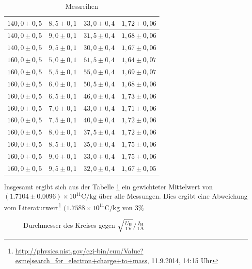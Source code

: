 \documentclass[12pt,a4paper,titlepage,headinclude,bibtotoc]{scrartcl}
\numberwithin{equation}{section}
\begin{document}
\begin{table}[h!]
\begin{tabular}{|c|c|c|c|}
		 $140,0 \pm 0,5$ & $8,5 \pm 0,1$& $33,0 \pm 0,4$ & $1,72 \pm 0,06$\\
		 \hline                         
		 $140,0 \pm 0,5$ & $9,0 \pm 0,1$& $31,5 \pm 0,4$ & $1,68 \pm 0,06$\\
		 \hline                         
		 $140,0 \pm 0,5$ & $9,5 \pm 0,1$& $30,0 \pm 0,4$ & $1,67 \pm 0,06$\\
		 \hline                         
		 $160,0 \pm 0,5$ & $5,0 \pm 0,1$& $61,5 \pm 0,4$ & $1,64 \pm 0,07$\\
		 \hline                         
		 $160,0 \pm 0,5$ & $5,5 \pm 0,1$& $55,0 \pm 0,4$ & $1,69 \pm 0,07$\\
		 \hline                         
		 $160,0 \pm 0,5$ & $6,0 \pm 0,1$& $50,5 \pm 0,4$ & $1,68 \pm 0,06$\\
		 \hline                         
		 $160,0 \pm 0,5$ & $6,5 \pm 0,1$& $46,0 \pm 0,4$ & $1,73 \pm 0,06$\\
		 \hline                         
		 $160,0 \pm 0,5$ & $7,0 \pm 0,1$& $43,0 \pm 0,4$ & $1,71 \pm 0,06$\\
		 \hline                         
		 $160,0 \pm 0,5$ & $7,5 \pm 0,1$& $40,0 \pm 0,4$ & $1,72 \pm 0,06$\\
		 \hline                         
		 $160,0 \pm 0,5$ & $8,0 \pm 0,1$& $37,5 \pm 0,4$ & $1,72 \pm 0,06$\\
		 \hline                         
		 $160,0 \pm 0,5$ & $8,5 \pm 0,1$& $35,0 \pm 0,4$ & $1,75 \pm 0,06$\\
		 \hline                         
		 $160,0 \pm 0,5$ & $9,0 \pm 0,1$& $33,0 \pm 0,4$ & $1,75 \pm 0,06$\\
		 \hline                         
		 $160,0 \pm 0,5$ & $9,5 \pm 0,1$& $32,0 \pm 0,4$ & $1,67 \pm 0,05$\\
		  \hline
	  \end{tabular}
	  \caption{Messreihen}
	  \label{tbl:pythonmessung}
  \end{table}
Insgesamt ergibt sich aus der Tabelle \ref{tbl:pythonmessung} ein gewichteter Mittelwert von $(1.7104 \pm 0.0096)\times 10^{11}\si{\coulomb/\kilo\gram}$ über alle Messungen.
Dies ergibt eine Abweichung vom Literaturwert\footnote{\url{http://physics.nist.gov/cgi-bin/cuu/Value?esme|search_for=electron+charge+to+mass}, 11.9.2014, 14:15 Uhr} $(1.7588\times 10^{11}\si{\coulomb/\kilo\gram}$ von $3\%$

\begin{figure}[!h]
	\centering
	\caption{Durchmesser des Kreises gegen $\sqrt{\frac{U_\text{B}}{1\text V}}/\frac{I_\text{H}}{1\text A}$}
	\label{fig:eric}
\end{figure}
\end{document}
